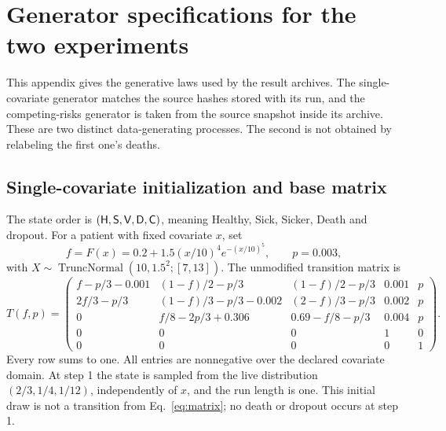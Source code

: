 \section{Generator specifications for the two experiments}\label{app:generator}
This appendix gives the generative laws used by the result archives. The single-covariate generator matches the source hashes stored with its run, and the competing-risks generator is taken from the source snapshot inside its archive. These are two distinct data-generating processes. The second is not obtained by relabeling the first one's deaths.

\subsection{Single-covariate initialization and base matrix}
The state order is $(\mathsf H,\mathsf S,\mathsf V,\mathsf D,\mathsf C)$, meaning Healthy, Sick, Sicker, Death and dropout. For a patient with fixed covariate $x$, set
\[
f=F(x)=0.2+1.5(x/10)^4e^{-(x/10)^5},\qquad p=0.003,
\]
with $X\sim\operatorname{TruncNormal}(10,1.5^2;[7,13])$. The unmodified transition matrix is
\begin{equation}\label{eq:matrix}
T(f,p)=\begin{pmatrix}
f-p/3-0.001 &(1-f)/2-p/3 &(1-f)/2-p/3 &0.001&p\\
2f/3-p/3 &(1-f)/3-p/3-0.002 &(2-f)/3-p/3 &0.002&p\\
0 &f/8-2p/3+0.306 &0.69-f/8-p/3 &0.004&p\\
0&0&0&1&0\\0&0&0&0&1
\end{pmatrix}.
\end{equation}
Every row sums to one. All entries are nonnegative over the declared covariate domain. At step 1 the state is sampled from the live distribution $(2/3,1/4,1/12)$, independently of $x$, and the run length is one. This initial draw is not a transition from Eq.~\eqref{eq:matrix}; no death or dropout occurs at step 1.

